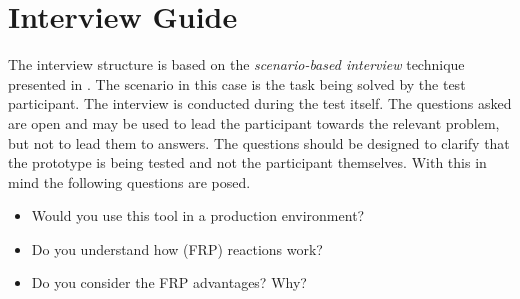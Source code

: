 \chapter{Interview Guide}
The interview structure is based on the \textit{scenario-based interview} technique presented in \cite{blackwell2004champagne}. The scenario in this case is the task being solved by the test participant. The interview is conducted during the test itself. The questions asked are open and may be used to lead the participant towards the relevant problem, but not to lead them to answers. The questions should be designed to clarify that the prototype is being tested and not the participant themselves. With this in mind the following questions are posed.

\begin{itemize}
  \item Would you use this tool in a production environment?
  \item Do you understand how (FRP) reactions work?
  \item Do you consider the FRP advantages? Why?
\end{itemize}
